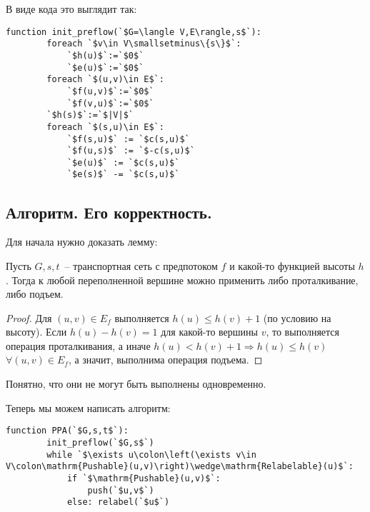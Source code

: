 В виде кода это выглядит так:
\begin{lstlisting}[escapeinside=``]
	function init_preflow(`$G=\langle V,E\rangle,s$`):
		foreach `$v\in V\smallsetminus\{s\}$`:
			`$h(u)$`:=`$0$`
			`$e(u)$`:=`$0$`
		foreach `$(u,v)\in E$`:
			`$f(u,v)$`:=`$0$`
			`$f(v,u)$`:=`$0$`
		`$h(s)$`:=`$|V|$`
		foreach `$(s,u)\in E$`:
			`$f(s,u)$` := `$c(s,u)$`
			`$f(u,s)$` := `$-c(s,u)$`
			`$e(u)$` := `$c(s,u)$`
			`$e(s)$` -= `$c(s,u)$`
\end{lstlisting}

\subsection{Алгоритм. Его корректность.}
Для начала нужно доказать лемму:
\begin{lemma}\label{someshit8}
	Пусть $G,s,t$~-- транспортная сеть с предпотоком $f$ и какой-то функцией высоты $h$. Тогда к любой переполненной вершине можно применить либо проталкивание, либо подъем.
\end{lemma}
\begin{proof}
	Для $(u,v)\in E_f$ выполняется $h(u)\le h(v)+1$ (по условию на высоту). Если $h(u)-h(v)=1$ для какой-то вершины $v$, то выполняется операция проталкивания, а иначе $h(u)<h(v)+1\Rightarrow h(u)\le h(v)$ $\forall (u,v)\in E_f$, а значит, выполнима операция подъема.
\end{proof}
Понятно, что они не могут быть выполнены одновременно.

Теперь мы можем написать алгоритм:
\begin{lstlisting}[escapeinside=``]
	function PPA(`$G,s,t$`):
		init_preflow(`$G,s$`)
		while `$\exists u\colon\left(\exists v\in V\colon\mathrm{Pushable}(u,v)\right)\wedge\mathrm{Relabelable}(u)$`:
			if `$\mathrm{Pushable}(u,v)$`:
				push(`$u,v$`)
			else: relabel(`$u$`)
\end{lstlisting}

